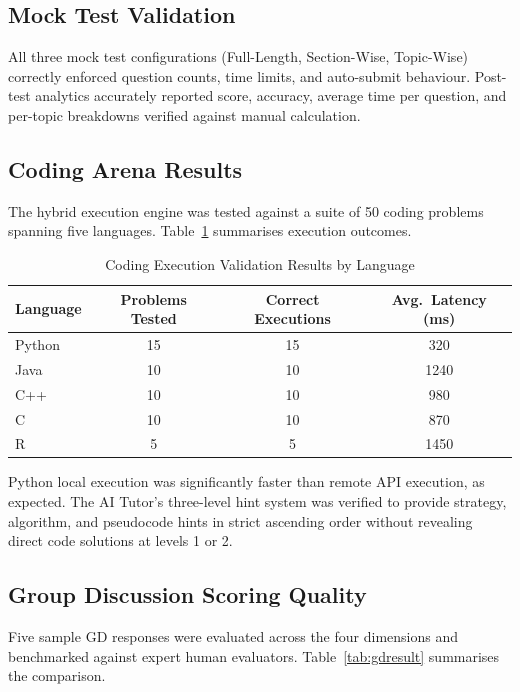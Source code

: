\documentclass[12pt,a4paper]{report}
\begin{document}
\subsection{Mock Test Validation}

All three mock test configurations (Full-Length, Section-Wise, Topic-Wise) correctly enforced question counts, time limits, and auto-submit behaviour. Post-test analytics accurately reported score, accuracy, average time per question, and per-topic breakdowns verified against manual calculation.

\subsection{Coding Arena Results}

The hybrid execution engine was tested against a suite of 50 coding problems spanning five languages. Table~\ref{tab:coderesult} summarises execution outcomes.

\begin{table}[H]
    \centering
    \caption{Coding Execution Validation Results by Language}
    \label{tab:coderesult}
    \begin{tabular}{|l|c|c|c|}
        \hline
        \textbf{Language} & \textbf{Problems Tested} & \textbf{Correct Executions} & \textbf{Avg.\ Latency (ms)} \\
        \hline
        Python  & 15 & 15 & 320 \\
        Java    & 10 & 10 & 1240 \\
        C++     & 10 & 10 & 980 \\
        C       & 10 & 10 & 870 \\
        R       & 5  & 5  & 1450 \\
        \hline
    \end{tabular}
\end{table}

Python local execution was significantly faster than remote API execution, as expected. The AI Tutor's three-level hint system was verified to provide strategy, algorithm, and pseudocode hints in strict ascending order without revealing direct code solutions at levels 1 or 2.

\subsection{Group Discussion Scoring Quality}

Five sample GD responses were evaluated across the four dimensions and benchmarked against expert human evaluators. Table~\ref{tab:gdresult} summarises the comparison.
\end{document}
